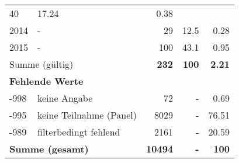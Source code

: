 \begin{longtable}{lXrrr}
       \num{40} &
       \num[round-mode=places,round-precision=2]{17,24} &
         \num[round-mode=places,round-precision=2]{0,38} \\

     2014 &
     \multicolumn{1}{X}{ -  } &


       \num{29} &
       \num[round-mode=places,round-precision=2]{12,5} &
         \num[round-mode=places,round-precision=2]{0,28} \\

     2015 &
     \multicolumn{1}{X}{ -  } &


       \num{100} &
       \num[round-mode=places,round-precision=2]{43,1} &
         \num[round-mode=places,round-precision=2]{0,95} \\
     \midrule
     \multicolumn{2}{l}{Summe (gültig)} &
       \textbf{\num{232}} &
     \textbf{100} &
       \textbf{\num[round-mode=places,round-precision=2]{2,21}} \\
     \multicolumn{5}{l}{\textbf{Fehlende Werte}}\\
       -998 &
       keine Angabe &
         \num{72} &
        - &
         \num[round-mode=places,round-precision=2]{0,69} \\
       -995 &
       keine Teilnahme (Panel) &
         \num{8029} &
        - &
         \num[round-mode=places,round-precision=2]{76,51} \\
       -989 &
       filterbedingt fehlend &
         \num{2161} &
        - &
         \num[round-mode=places,round-precision=2]{20,59} \\
     \midrule
     \multicolumn{2}{l}{\textbf{Summe (gesamt)}} &
          \textbf{\num{10494}} &
        \textbf{-} &
        \textbf{100} \\
     \bottomrule
     \end{longtable}
     
